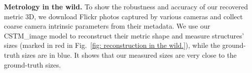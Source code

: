 \begin{table}[t]
\caption{
Comparison of VO error on ETH3D benchmark. Droid SLAM system is input with our depth (`Droid + Ours'), and ground-truth depth (`Droid + GT'). The average trajectory error is reported.
}
\label{Tab: ETH3D SLAM}
\vspace{-1 em}
\end{table}

\noindent\textbf{Metrology in the wild.} To show the robustness and accuracy of our recovered metric 3D, we download Flickr photos captured by various cameras and collect coarse camera intrinsic parameters from their metadata. We use our CSTM\_image model to reconstruct their metric shape and measure structures' sizes (marked in red in Fig.~\ref{fig: reconstruction in the wild.}), while the ground-truth sizes are in blue. It shows that our measured sizes are very close to the ground-truth sizes. 






